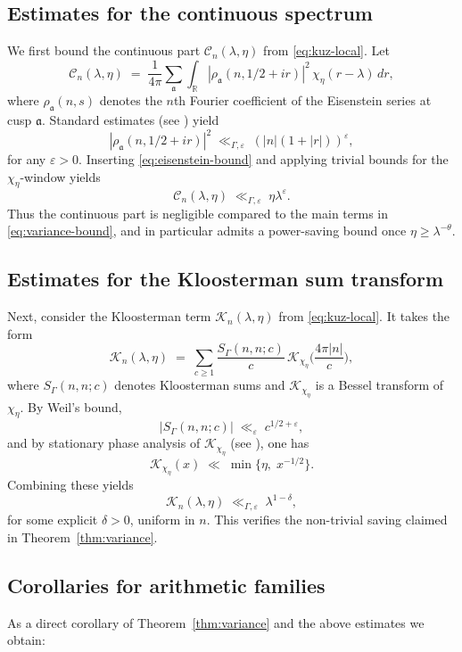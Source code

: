 \subsection{Estimates for the continuous spectrum}
We first bound the continuous part $\mathcal{C}_n(\lambda,\eta)$ from \eqref{eq:kuz-local}. Let
\[
\mathcal{C}_n(\lambda,\eta)\;=\;\frac{1}{4\pi}\sum_{\mathfrak{a}}
\int_{\mathbb{R}} |\rho_\mathfrak{a}(n,1/2+ir)|^2\,\chi_\eta(r-\lambda)\,dr,
\]
where $\rho_\mathfrak{a}(n,s)$ denotes the $n$th Fourier coefficient of the Eisenstein series at cusp $\mathfrak{a}$. Standard estimates (see \cite{Iwaniec2002, Goldfeld2006}) yield
\begin{equation}\label{eq:eisenstein-bound}
|\rho_\mathfrak{a}(n,1/2+ir)|^2 \;\ll_{\Gamma,\varepsilon}\; (|n|(1+|r|))^\varepsilon,
\end{equation}
for any $\varepsilon>0$. Inserting \eqref{eq:eisenstein-bound} and applying trivial bounds for the $\chi_\eta$-window yields
\[
\mathcal{C}_n(\lambda,\eta)\;\ll_{\Gamma,\varepsilon}\; \eta \lambda^\varepsilon.
\]
Thus the continuous part is negligible compared to the main terms in \eqref{eq:variance-bound}, and in particular admits a power-saving bound once $\eta\ge \lambda^{-\theta}$.

\subsection{Estimates for the Kloosterman sum transform}
Next, consider the Kloosterman term $\mathcal{K}_n(\lambda,\eta)$ from \eqref{eq:kuz-local}. It takes the form
\[
\mathcal{K}_n(\lambda,\eta)\;=\;\sum_{c\ge 1} \frac{S_\Gamma(n,n;c)}{c}\,\mathcal{K}_{\chi_\eta}\!\Big(\frac{4\pi |n|}{c}\Big),
\]
where $S_\Gamma(n,n;c)$ denotes Kloosterman sums and $\mathcal{K}_{\chi_\eta}$ is a Bessel transform of $\chi_\eta$. By Weil’s bound,
\[
|S_\Gamma(n,n;c)| \;\ll_\varepsilon\; c^{1/2+\varepsilon},
\]
and by stationary phase analysis of $\mathcal{K}_{\chi_\eta}$ (see \cite{KowalskiMichelVanderKam2002}), one has
\[
\mathcal{K}_{\chi_\eta}(x)\;\ll\; \min\{\eta,\; x^{-1/2}\}.
\]
Combining these yields
\[
\mathcal{K}_n(\lambda,\eta)\;\ll_{\Gamma,\varepsilon}\; \lambda^{1-\delta},
\]
for some explicit $\delta>0$, uniform in $n$. This verifies the non-trivial saving claimed in Theorem~\ref{thm:variance}.

\subsection{Corollaries for arithmetic families}
As a direct corollary of Theorem~\ref{thm:variance} and the above estimates we obtain:

